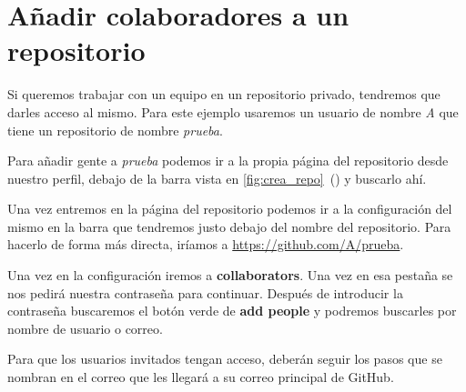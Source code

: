 \section{Añadir colaboradores a un repositorio}

Si queremos trabajar con un equipo en un repositorio privado, tendremos que darles acceso al mismo. Para este ejemplo usaremos un usuario de nombre \textit{A} que tiene un repositorio de nombre \textit{prueba}.

Para añadir gente a \textit{prueba} podemos ir a la propia página del repositorio desde nuestro perfil, debajo de la barra vista en \ref{fig:crea_repo}~() y buscarlo ahí.

Una vez entremos en la página del repositorio podemos ir a la configuración del mismo en la barra que tendremos justo debajo del nombre del repositorio.
Para hacerlo de forma más directa, iríamos a \url{https://github.com/A/prueba}.

Una vez en la configuración iremos a \textbf{collaborators}. Una vez en esa pestaña se nos pedirá nuestra contraseña para continuar. Después de introducir la contraseña buscaremos el botón verde de \textbf{add people} y podremos buscarles por nombre de usuario o correo.

Para que los usuarios invitados tengan acceso, deberán seguir los pasos que se nombran en el correo que les llegará a su correo principal de GitHub.

